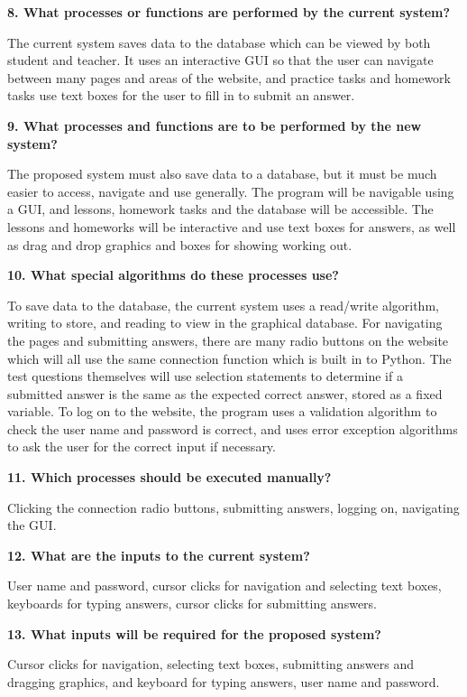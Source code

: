 \textbf{8. What processes or functions are performed by the current system?}

The current system saves data to the database which can be viewed by both student and teacher. It uses an interactive GUI so that the user can navigate between many pages and areas of the website, and practice tasks and homework tasks use text boxes for the user to fill in to submit an answer.

\textbf{9. What processes and functions are to be performed by the new system?}

The proposed system must also save data to a database, but it must be much easier to access, navigate and use generally. The program will be navigable using a GUI, and lessons, homework tasks and the database will be accessible. The lessons and homeworks will be interactive and use text boxes for answers, as well as drag and drop graphics and boxes for showing working out.

\textbf{10. What special algorithms do these processes use?}

To save data to the database, the current system uses a read/write algorithm, writing to store, and reading to view in the graphical database. For navigating the pages and submitting answers, there are many radio buttons on the website which will all use the same connection function which is built in to Python. The test questions themselves will use selection statements to determine if a submitted answer is the same as the expected correct answer, stored as a fixed variable. To log on to the website, the program uses a validation algorithm to check the user name and password is correct, and uses error exception algorithms to ask the user for the correct input if necessary.

\textbf{11. Which processes should be executed manually?}

Clicking the connection radio buttons, submitting answers, logging on, navigating the GUI.

\textbf{12. What are the inputs to the current system?}

User name and password, cursor clicks for navigation and selecting text boxes, keyboards for typing answers, cursor clicks for submitting answers.

\textbf{13. What inputs will be required for the proposed system?}

Cursor clicks for navigation, selecting text boxes, submitting answers and dragging graphics, and keyboard for typing answers, user name and password.

